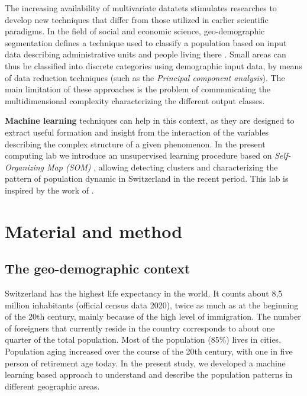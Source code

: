 \documentclass[
]{book}
\begin{document}
The increasing availability of multivariate datatets stimulates researches to develop new techniques that differ from those utilized in earlier scientific paradigms.
In the field of social and economic science, geo-demographic segmentation defines a technique used to classify a population based on input data describing administrative units and people living there \citep[see][]{spielman_social_2008}.
Small areas can thus be classified into discrete categories using demographic input data, by means of data reduction techniques (such as the \emph{Principal component analysis}).
The main limitation of these approaches is the problem of communicating the multidimensional complexity characterizing the different output classes.

\textbf{Machine learning} techniques can help in this context, as they are designed to extract useful formation and insight from the interaction of the variables describing the complex structure of a given phenomenon.
In the present computing lab we introduce an unsupervised learning procedure based on \emph{Self-Organizing Map (SOM)} \citep[see][]{kohonen_self-organized_1982}, allowing detecting clusters and characterizing the pattern of population dynamic in Switzerland in the recent period.
This lab is inspired by the work of \citet{marj_tonini_unsupervised_2023}.

\hypertarget{material-and-method}{%
\section{Material and method}\label{material-and-method}}

\hypertarget{the-geo-demographic-context}{%
\subsection{The geo-demographic context}\label{the-geo-demographic-context}}

Switzerland has the highest life expectancy in the world.
It counts about 8,5 million inhabitants (official census data 2020), twice as much as at the beginning of the 20th century, mainly because of the high level of immigration.
The number of foreigners that currently reside in the country corresponds to about one quarter of the total population.
Most of the population (85\%) lives in cities.
Population aging increased over the course of the 20th century, with one in five person of retirement age today.
In the present study, we developed a machine learning based approach to understand and describe the population patterns in different geographic areas.
\end{document}
